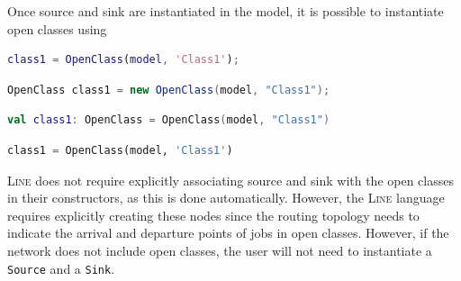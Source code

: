 Once source and sink are instantiated in the model, it is possible to instantiate open classes using
\begin{MATLAB}
\begin{lstlisting}[language = matlab]
class1 = OpenClass(model, 'Class1');
\end{lstlisting}
\end{MATLAB}
\begin{JAVA}
\begin{lstlisting}[language = java, basicstyle=\ttfamily\scriptsize]
OpenClass class1 = new OpenClass(model, "Class1");
\end{lstlisting}
\end{JAVA}
\begin{KOTLIN}
\begin{lstlisting}[language = kotlin, basicstyle=\ttfamily\scriptsize]
val class1: OpenClass = OpenClass(model, "Class1")
\end{lstlisting}
\end{KOTLIN}
\begin{PYTHON}
\begin{lstlisting}[language = python]
class1 = OpenClass(model, 'Class1')
\end{lstlisting}
\end{PYTHON}
\textsc{Line} does not require explicitly associating source and sink with the open classes in their constructors, as this is done automatically. However, the \textsc{Line} language requires explicitly creating these nodes since the routing topology needs to indicate the arrival and departure points of jobs in open classes. However, if the network does not include open classes, the user will not need to instantiate a \texttt{Source} and a \texttt{Sink}.

